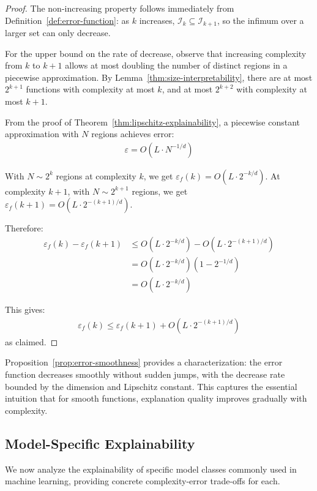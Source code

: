 \documentclass[11pt,letter,leqno]{article}
\begin{document}
\begin{proof}
The non-increasing property follows immediately from Definition~\ref{def:error-function}: as $k$ increases, $\mathcal{I}_k \subseteq \mathcal{I}_{k+1}$, so the infimum over a larger set can only decrease.

For the upper bound on the rate of decrease, observe that increasing complexity from $k$ to $k+1$ allows at most doubling the number of distinct regions in a piecewise approximation. By Lemma~\ref{thm:size-interpretability}, there are at most $2^{k+1}$ functions with complexity at most $k$, and at most $2^{k+2}$ with complexity at most $k+1$.

From the proof of Theorem~\ref{thm:lipschitz-explainability}, a piecewise constant approximation with $N$ regions achieves error:
\begin{align}
\varepsilon = O(L \cdot N^{-1/d})
\end{align}

With $N \sim 2^k$ regions at complexity $k$, we get $\varepsilon_f(k) = O(L \cdot 2^{-k/d})$. At complexity $k+1$, with $N \sim 2^{k+1}$ regions, we get $\varepsilon_f(k+1) = O(L \cdot 2^{-(k+1)/d})$.

Therefore:
\begin{align}
\varepsilon_f(k) - \varepsilon_f(k+1) &\leq O(L \cdot 2^{-k/d}) - O(L \cdot 2^{-(k+1)/d})\\
&= O(L \cdot 2^{-k/d})(1 - 2^{-1/d})\\
&= O(L \cdot 2^{-k/d})
\end{align}

This gives:
\begin{align}
\varepsilon_f(k) \leq \varepsilon_f(k+1) + O(L \cdot 2^{-(k+1)/d})
\end{align}
as claimed.
\end{proof}

Proposition~\ref{prop:error-smoothness} provides a characterization: the error function decreases smoothly without sudden jumps, with the decrease rate bounded by the dimension and Lipschitz constant. This captures the essential intuition that for smooth functions, explanation quality improves gradually with complexity.

\subsection{Model-Specific Explainability}
\label{subsec:model-specific}

We now analyze the explainability of specific model classes commonly used in machine learning, providing concrete complexity-error trade-offs for each.
\end{document}

